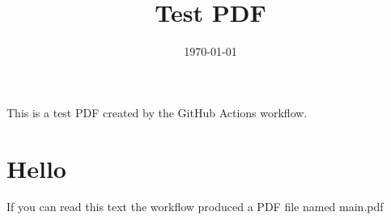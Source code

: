 \documentclass[12pt]{article}
\title{Test PDF}
\author{}
\date{\today}
\begin{document}
\maketitle

This is a test PDF created by the GitHub Actions workflow.

\section*{Hello}
If you can read this text the workflow produced a PDF file named main.pdf
\end{document}
